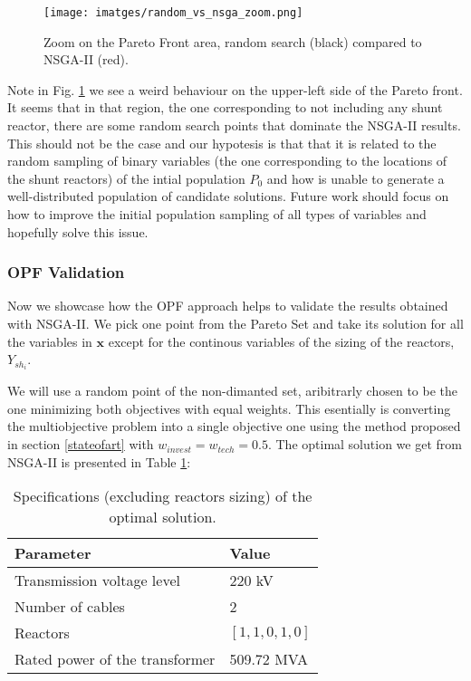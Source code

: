 \documentclass[a4paper,11pt, titlepage, twoside]{article}
\begin{document}
\begin{figure}[H]
    \centering
    \texttt{[image: imatges/random\_vs\_nsga\_zoom.png]}
    \caption{Zoom on the Pareto Front area, random search (black) compared to NSGA-II (red).}
    \label{fig:paretpnsga}
\end{figure}

Note in Fig. \ref{fig:paretpnsga} we see a weird behaviour on the upper-left side of the Pareto front. It seems that in that region, the one corresponding to not including any shunt reactor, there are some random search points that dominate the NSGA-II
results. This should not be the case and our hypotesis is that that it is related to the random sampling of binary variables (the one corresponding to the locations of the shunt reactors) of the intial population $P_0$ and how is unable to generate a well-distributed population of candidate solutions.
Future work should focus on how to improve the initial population sampling of all types of variables and hopefully solve this issue. 


\subsubsection{OPF Validation}

Now we showcase how the OPF approach helps to validate the results obtained with NSGA-II. We pick one point from the Pareto Set and  take its solution for all the variables in $\mathbf{x}$
except for the continous variables of the sizing of the reactors, $Y_{sh_i}$.

We will use a random point of the non-dimanted set, aribitrarly chosen to be the one minimizing both objectives with equal weights. This esentially is converting the multiobjective problem into a single objective one using the method proposed in section \ref{stateofart} with $w_{invest} = w_{tech} = 0.5$. The optimal solution we get from NSGA-II is
presented in Table \ref{table:optimalvaluesdicrete}:

\begin{table}[H]
    \centering
    \begin{tabular}{l l}
    \hline
    \textbf{Parameter} & \textbf{Value} \\
    \hline
    Transmission voltage level & 220 kV \\
    Number of cables & 2 \\
    Reactors & $[1, 1, 0, 1, 0]$ \\
    Rated power of the transformer & 509.72 MVA \\
    \hline
    \end{tabular}
    \caption{Specifications (excluding reactors sizing) of the optimal solution.}
    \label{table:optimalvaluesdicrete}
    \end{table}
\end{document}

